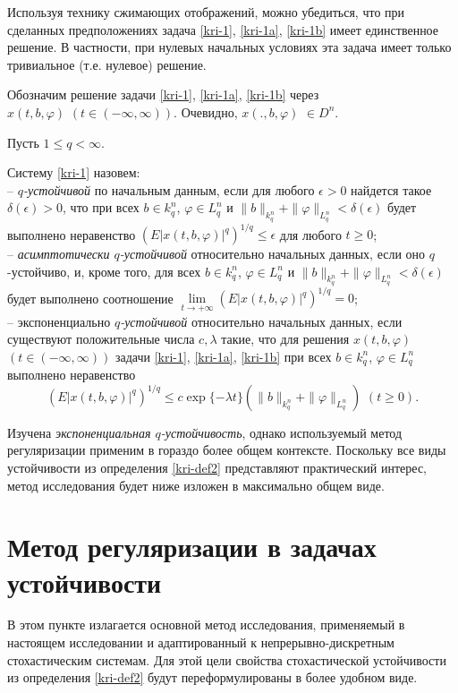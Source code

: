 Используя технику сжимающих отображений, можно убедиться, что при
сделанных предположениях задача \eqref{kri-1}, \eqref{kri-1a}, \eqref{kri-1b} имеет единственное
решение. В частности, при нулевых начальных условиях эта задача
имеет только тривиальное (т.е. нулевое) решение.

Обозначим решение задачи \eqref{kri-1}, \eqref{kri-1a}, \eqref{kri-1b} через $x(t, b,
\varphi)\,\,(t \in (-\infty , \infty ) )$. Очевидно, $x(., b,
\varphi) $ $ \in D^n$.

Пусть $1\le q<\infty$.

\begin{definition}\label{kri-def2} Систему \eqref{kri-1} назовем:\\
\noindent
  -- \textit{$q$-устойчивой} по начальным данным,
 если
 для любого $\epsilon > 0$ найдется такое $\delta (\epsilon)
 > 0$,
 что при всех $b \in k^n_q$, $\varphi \in L^n_q$ и
 $\|b\|_{k^n_q} + \|\varphi \|_{L^n_q} < \delta (\epsilon)$
 будет
 выполнено неравенство $(E|x(t, b, \varphi)|^q)^{1/q} \le
 \epsilon $
 для любого $t \ge 0$;\\
  -- \textit{ асимптотически $q$-устойчивой }относительно
 начальных данных, если
 оно $q$-устойчиво, и, кроме того, для всех $b \in k^n_q$,
 $\varphi \in L^n_q$ и $\|b\|_{k^n_q} + \|\varphi \|_{L^n_q}
 <
 \delta (\epsilon)$ будет выполнено соотношение $\lim \limits_{t  \rightarrow
 +\infty
 }(E|x(t, b, \varphi)|^q)^{1/q} = 0$;\\
-- экспоненциально \textit{ $q$-устойчивой}  относительно
 начальных
 данных, если существуют положительные числа $c, \lambda$
 такие, что
 для решения $x(t, b, \varphi)$ $(t \in (-\infty , \infty ))$ задачи \eqref{kri-1}, \eqref{kri-1a}, \eqref{kri-1b}
 при всех $b \in k^n_q$, $\varphi \in L^n_q$ выполнено неравенство
 $$
 (E|x(t, b, \varphi)|^q)^{1/q} \leq c\exp \{-\lambda
 t\}\left(\|b\|_{k_q^n} + \|\varphi \|_{L^n_q}\right){\,}
 {\,} (t \geq 0).
 $$
\end{definition}

Изучена \textit{экспоненциальная $q$-устойчивость}, однако
используемый метод регуляризации применим в гораздо более общем
контексте. Поскольку все виды устойчивости из определения \ref{kri-def2}
представляют практический интерес, метод исследования будет ниже
изложен в максимально общем виде.

\smallskip

\section{Метод регуляризации в задачах устойчивости}\label{kri-s2}
В этом пункте излагается основной метод исследования, применяемый в
настоящем исследовании и адаптированный к непрерывно-дискретным стохастическим
системам. Для этой цели свойства стохастической устойчивости из
определения \ref{kri-def2} будут переформулированы в более удобном виде.

